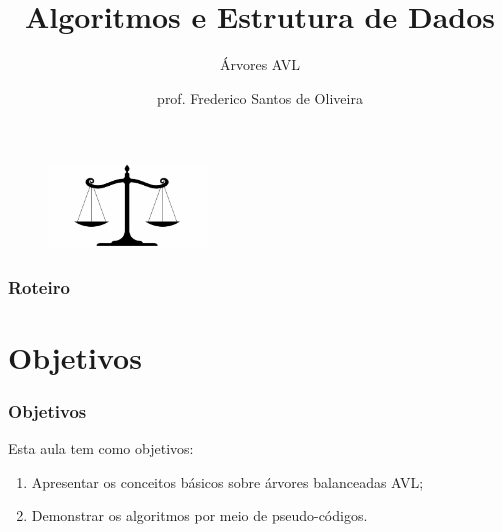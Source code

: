\documentclass[aspectratio=169]{beamer}
\title[Árvores AVL]{Algoritmos e Estrutura de Dados}
\subtitle{Árvores AVL}
\author[Frederico Santos de Oliveira]{prof. Frederico Santos de Oliveira}
\institute[UFMT]{Universidade Federal de Mato Grosso\\ Faculdade de Engenharia}
\date{}
\begin{document}
\begin{frame}
\titlepage %

\begin{figure}[!h]
  \centering
   \includegraphics[width=120pt]{imagens/balanca.jpg}
  \label{fig_introducao}
\end{figure}
\end{frame}


\begin{frame}
\frametitle{Roteiro} %
\tableofcontents %
\end{frame}


\section{Objetivos}

\begin{frame}
\frametitle{Objetivos}
Esta aula tem como objetivos:
\begin{enumerate}
\item Apresentar os conceitos básicos sobre árvores balanceadas AVL;
\item Demonstrar os algoritmos por meio de pseudo-códigos.
\end{enumerate}
\end{frame}
\end{document}
